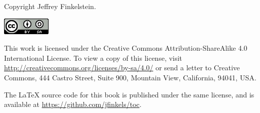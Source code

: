{\small
Copyright \the\year{} Jeffrey Finkelstein.

{\centering \includegraphics[width=88px,height=31px]{ccbysa}}

This work is licensed under the Creative Commons Attribution-ShareAlike 4.0
International License. To view a copy of this license, visit
\url{http://creativecommons.org/licenses/by-sa/4.0/} or send a letter to
Creative Commons, 444 Castro Street, Suite 900, Mountain View, California,
94041, USA.

The \LaTeX{} source code for this book is published under the same license, and is available at \url{https://github.com/jfinkels/toc}.
}
